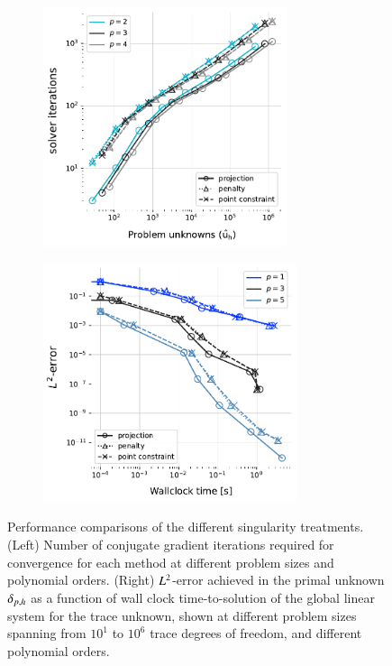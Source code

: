 \begin{figure}[ht]
    \centering
    \begin{subfigure}{0.45\textwidth}
        \includegraphics[height=7cm]{img/PNP_solver_iterations.pdf}
        \caption{}
        \label{fig:PNP_treatments_CG_iterations}
    \end{subfigure}
    \begin{subfigure}{0.45\textwidth}
        \includegraphics[height=7cm]{img/PNP_treatment_wall_times.pdf}
        \caption{}
        \label{fig:PNP_treatments_wall_time}
    \end{subfigure}
    \caption{Performance comparisons of the different singularity treatments.
    (Left) Number of conjugate gradient iterations required for convergence for each method at different problem sizes and polynomial orders.
    (Right) $L^2$-error achieved in the primal unknown $\delta_{p,h}$ as a function of wall clock time-to-solution of the global linear system for the trace unknown, shown at different problem sizes spanning from $10^1$ to $10^6$ trace degrees of freedom, and different polynomial orders.}
    \label{fig:PNP_treatment_performance}
\end{figure}

